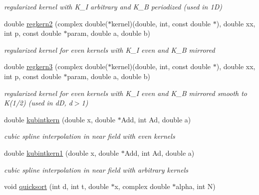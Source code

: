 \begin{CompactItemize}
\begin{CompactList}\small\item\em regularized kernel with K\_\-I arbitrary and K\_\-B periodized (used in 1D) \item\end{CompactList}\item 
\hypertarget{group__applications__fastsum_ga6}{
double \hyperlink{group__applications__fastsum_ga6}{regkern2} (complex double($\ast$kernel)(double, int, const double $\ast$), double xx, int p, const double $\ast$param, double a, double b)}
\label{group__applications__fastsum_ga6}

\begin{CompactList}\small\item\em regularized kernel for even kernels with K\_\-I even and K\_\-B mirrored \item\end{CompactList}\item 
\hypertarget{group__applications__fastsum_ga7}{
double \hyperlink{group__applications__fastsum_ga7}{regkern3} (complex double($\ast$kernel)(double, int, const double $\ast$), double xx, int p, const double $\ast$param, double a, double b)}
\label{group__applications__fastsum_ga7}

\begin{CompactList}\small\item\em regularized kernel for even kernels with K\_\-I even and K\_\-B mirrored smooth to K(1/2) (used in d\-D, d$>$1) \item\end{CompactList}\item 
\hypertarget{group__applications__fastsum_ga8}{
double \hyperlink{group__applications__fastsum_ga8}{kubintkern} (double x, double $\ast$Add, int Ad, double a)}
\label{group__applications__fastsum_ga8}

\begin{CompactList}\small\item\em cubic spline interpolation in near field with even kernels \item\end{CompactList}\item 
\hypertarget{group__applications__fastsum_ga9}{
double \hyperlink{group__applications__fastsum_ga9}{kubintkern1} (double x, double $\ast$Add, int Ad, double a)}
\label{group__applications__fastsum_ga9}

\begin{CompactList}\small\item\em cubic spline interpolation in near field with arbitrary kernels \item\end{CompactList}\item 
\hypertarget{group__applications__fastsum_ga10}{
void \hyperlink{group__applications__fastsum_ga10}{quicksort} (int d, int t, double $\ast$x, complex double $\ast$alpha, int N)}
\label{group__applications__fastsum_ga10}


\end{CompactItemize}
